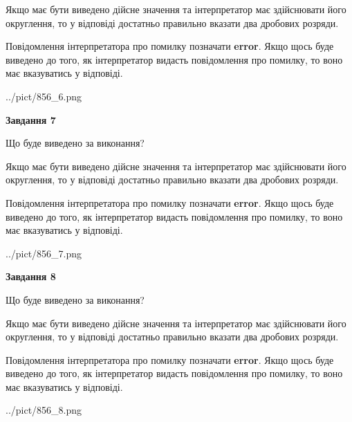 \documentclass[12pt, ukrainian]{article}
\begin{document}
{\begin {Large}
Якщо має бути виведено дійсне значення та інтерпретатор має здійснювати його округлення, 
то у відповіді достатньо правильно вказати два дробових розряди.

Повідомлення інтерпретатора про помилку позначати \textbf{error}.
Якщо щось буде виведено до того, як інтерпретатор видасть повідомлення про помилку, 
то воно має вказуватись у відповіді. \par

\begin{center}
	{../pict/856_6.png}
\end{center}
\newpage

{\begin {center}\textbf{Завдання 7}\end {center}}\par
Що буде виведено за виконання? \par

Якщо має бути виведено дійсне значення та інтерпретатор має здійснювати його округлення, 
то у відповіді достатньо правильно вказати два дробових розряди.

Повідомлення інтерпретатора про помилку позначати \textbf{error}.
Якщо щось буде виведено до того, як інтерпретатор видасть повідомлення про помилку, 
то воно має вказуватись у відповіді. \par

\begin{center}
	{../pict/856_7.png}
\end{center}
\newpage

{\begin {center}\textbf{Завдання 8}\end {center}}\par
Що буде виведено за виконання? \par

Якщо має бути виведено дійсне значення та інтерпретатор має здійснювати його округлення, 
то у відповіді достатньо правильно вказати два дробових розряди.

Повідомлення інтерпретатора про помилку позначати \textbf{error}.
Якщо щось буде виведено до того, як інтерпретатор видасть повідомлення про помилку, 
то воно має вказуватись у відповіді. \par

\begin{center}
	{../pict/856_8.png}
\end{center}
\newpage


\end{Large}}
\end{document}
